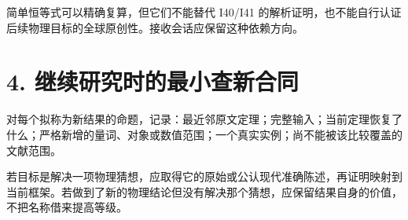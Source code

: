 \documentclass[UTF8,a4paper,11pt,fontset=fandol]{ctexart}
\begin{document}
简单恒等式可以精确复算，但它们不能替代 I40/I41
的解析证明，也不能自行认证后续物理目标的全球原创性。接收会话应保留这种依赖方向。

\section{4.
继续研究时的最小查新合同}\label{ux7ee7ux7eedux7814ux7a76ux65f6ux7684ux6700ux5c0fux67e5ux65b0ux5408ux540c}

对每个拟称为新结果的命题，记录：最近邻原文定理；完整输入；当前定理恢复了什么；严格新增的量词、对象或数值范围；一个真实实例；尚不能被该比较覆盖的文献范围。

若目标是解决一项物理猜想，应取得它的原始或公认现代准确陈述，再证明映射到当前框架。若做到了新的物理结论但没有解决那个猜想，应保留结果自身的价值，不把名称借来提高等级。
\end{document}
